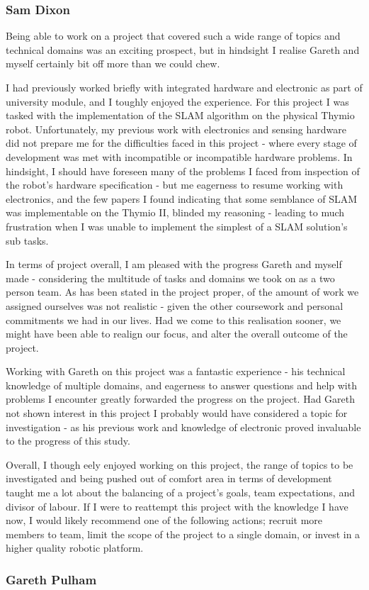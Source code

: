 \subsubsection{Sam Dixon}
Being able to work on a project that covered such a wide range of topics and
technical domains was an exciting prospect, but in hindsight I realise Gareth
and myself certainly bit off more than we could chew.

I had previously worked briefly with integrated hardware and electronic as
part of university module, and I toughly enjoyed the experience.
For this project I was tasked with the implementation of the SLAM algorithm on
the physical Thymio robot.
Unfortunately, my previous work with electronics and sensing hardware did not
prepare me for the difficulties faced in this project - where every stage of
development was met with incompatible or incompatible hardware problems.
In hindsight, I should have foreseen many of the problems I faced from
inspection of the robot's hardware specification - but me eagerness to resume
working with electronics, and the few papers I found indicating that some
semblance of SLAM was implementable on the Thymio II, blinded my reasoning -
leading to much frustration when I was unable to implement the simplest of
a SLAM solution's sub tasks.

In terms of project overall, I am pleased with the progress Gareth and myself
made - considering the multitude of tasks and domains we took on as a two
person team.
As has been stated in the project proper, of the amount of work we assigned
ourselves was not realistic - given the other coursework and personal
commitments we had in our lives.
Had we come to this realisation sooner, we might have been able to realign our
focus, and alter the overall outcome of the project.

Working with Gareth on this project was a fantastic experience - his technical
knowledge of multiple domains, and eagerness to answer questions and help
with problems I encounter greatly forwarded the progress on the project.
Had Gareth not shown interest in this project I probably would have considered a
topic for investigation - as his previous work and knowledge of electronic
proved invaluable to the progress of this study.

Overall, I though eely enjoyed working on this project, the range of topics to
be investigated and being pushed out of comfort area in terms of development
taught me a lot about the balancing of a project's goals, team expectations,
and divisor of labour.
If I were to reattempt this project with the knowledge I have now, I would
likely recommend one of the following actions; recruit more members to team,
limit the scope of the project to a single domain, or invest in a higher
quality robotic platform.

\subsubsection{Gareth Pulham}

